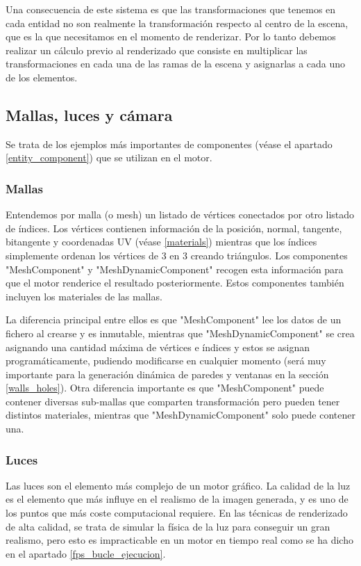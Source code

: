Una consecuencia de este sistema es que las transformaciones que tenemos en cada entidad no son realmente la transformación respecto al centro de la escena, que es la que necesitamos en el momento de renderizar. Por lo tanto debemos realizar un cálculo previo al renderizado que consiste en multiplicar las transformaciones en cada una de las ramas de la escena y asignarlas a cada uno de los elementos.

\subsection{Mallas, luces y cámara}
\label{mesh_light_cam}
Se trata de los ejemplos más importantes de componentes (véase el apartado \ref{entity_component}) que se utilizan en el motor.

\subsubsection{Mallas}
Entendemos por malla (o mesh) un listado de vértices conectados por otro listado de índices. Los vértices contienen información de la posición, normal, tangente, bitangente y coordenadas UV (véase \ref{materials}) mientras que los índices simplemente ordenan los vértices de 3 en 3 creando triángulos. Los componentes "MeshComponent" y "MeshDynamicComponent" recogen esta información para que el motor renderice el resultado posteriormente. Estos componentes también incluyen los materiales de las mallas.

La diferencia principal entre ellos es que "MeshComponent" lee los datos de un fichero al crearse y es inmutable, mientras que "MeshDynamicComponent" se crea asignando una cantidad máxima de vértices e índices y estos se asignan programáticamente, pudiendo modificarse en cualquier momento (será muy importante para la generación dinámica de paredes y ventanas en la sección \ref{walls_holes}). Otra diferencia importante es que "MeshComponent" puede contener diversas sub-mallas que comparten transformación pero pueden tener distintos materiales, mientras que "MeshDynamicComponent" solo puede contener una.

\subsubsection{Luces}
Las luces son el elemento más complejo de un motor gráfico. La calidad de la luz es el elemento que más influye en el realismo de la imagen generada, y es uno de los puntos que más coste computacional requiere. En las técnicas de renderizado de alta calidad, se trata de simular la física de la luz para conseguir un gran realismo, pero esto es impracticable en un motor en tiempo real como se ha dicho en el apartado \ref{fps_bucle_ejecucion}.

